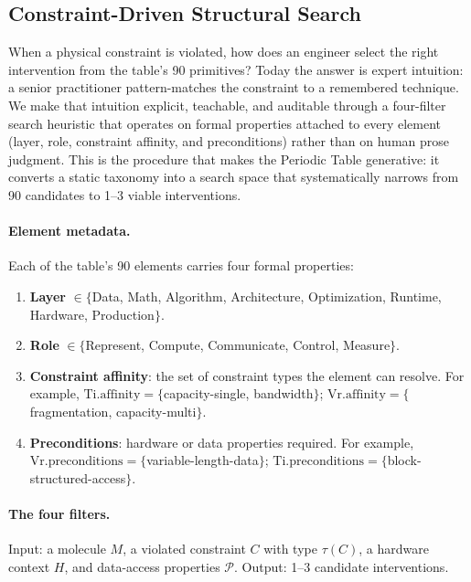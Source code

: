 \documentclass[10pt,twocolumn]{article}
\begin{document}
\subsection{Constraint-Driven Structural Search}
\label{sec:resolution}

When a physical constraint is violated, how does an engineer select the right intervention from the table's 90 primitives? Today the answer is expert intuition: a senior practitioner pattern-matches the constraint to a remembered technique. We make that intuition explicit, teachable, and auditable through a four-filter search heuristic that operates on formal properties attached to every element (layer, role, constraint affinity, and preconditions) rather than on human prose judgment. This is the procedure that makes the Periodic Table generative: it converts a static taxonomy into a search space that systematically narrows from 90 candidates to 1--3 viable interventions.

\paragraph{Element metadata.} Each of the table's 90 elements carries four formal properties:

\begin{enumerate}[nosep, leftmargin=*]
\item \textbf{Layer} $\in \{$Data, Math, Algorithm, Architecture, Optimization, Runtime, Hardware, Production$\}$.
\item \textbf{Role} $\in \{$Represent, Compute, Communicate, Control, Measure$\}$.
\item \textbf{Constraint affinity}: the set of constraint types the element can resolve. For example, $\text{Ti}.\text{affinity} = \{$capacity-single, bandwidth$\}$; $\text{Vr}.\text{affinity} = \{$fragmentation, capacity-multi$\}$.
\item \textbf{Preconditions}: hardware or data properties required. For example, $\text{Vr}.\text{preconditions} = \{$variable-length-data$\}$; $\text{Ti}.\text{preconditions} = \{$block-structured-access$\}$.
\end{enumerate}

\paragraph{The four filters.} Input: a molecule $M$, a violated constraint $C$ with type $\tau(C)$, a hardware context $H$, and data-access properties $\mathcal{P}$. Output: 1--3 candidate interventions.
\end{document}
